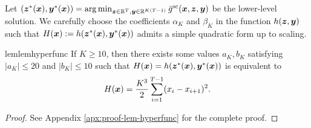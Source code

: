 \documentclass{article}
\begin{document}
Let $({\bm{z}}^*({\bm{x}}), {\bm{y}}^*({\bm{x}})) = \arg \min_{{\bm{z}} \in {\mathbb{R}}^{T}, {\bm{y}} \in {\mathbb{R}}^{K (T-1)}} \bar g^{\rm sc}({\bm{x}},{\bm{z}},{\bm{y}})$ be the lower-level solution. We carefully choose the coefficients $\alpha_K$ and $\beta_K$ in the function $h({\bm{z}},{\bm{y}})$ such that $H({\bm{x}}): = h({\bm{z}}^*({\bm{x}}), {\bm{y}}^*({\bm{x}}))$ admits a simple quadratic form up to scaling.



\begin{restatable}{lem}{lemhyperfunc}  \label{lem:hyperfunc}
If $K \ge 10$, then there exists some values $a_K, b_K$ satisfying $\vert a_K \vert \le 20$ and $\vert b_K \vert \le 10$ such that 
$H({\bm{x}}) = h({\bm{z}}^*({\bm{x}}), {\bm{y}}^*({\bm{x}}))$ is equivalent to
\begin{align} \label{eq:Hx-goal}
    H({\bm{x}}) = \frac{K^3}{2} \sum_{i=1}^{T-1} (x_i - x_{i+1})^2.
\end{align}
\end{restatable}

\begin{proof}
    See Appendix \ref{apx:proof-lem-hyperfunc} for the complete proof.
\end{proof}
\end{document}
